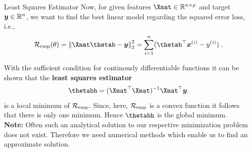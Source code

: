 \documentclass[11pt,compress,t,notes=noshow, xcolor=table]{beamer}
\begin{document}
\begin{vbframe}{Least Squares Estimator}
Now, for given features $\Xmat \in \mathbb{R}^{n\times p}$ and target $\bm{y} \in \mathbb{R}^n$, we want to find the best linear model regarding the squared error loss, i.e.,
\[\risket = \left\Vert \Xmat\thetab - \yv\right\Vert_2^2 = \sumin (\thetab^\top\xv^{(i)} - \yi)\;.\]

With the sufficient condition for continously differentiable functions it can be shown that the \textbf{least squares estimator}
\[\thetabh = (\Xmat^\top\Xmat)^{-1}\Xmat^\top\yv.\]
is a local minimum of $\mathcal{R}_{\text{emp}}$. Since, here, $\mathcal{R}_{\text{emp}}$ is a convex function it follows that there is only one minimum. Hence $\thetabh$ is the global minimum. \\

\lz \textbf{Note:} Often such an analytical solution to our respective minimization problem does not exist. Therefore we need numerical methods which enable us to find an approximate solution.

\end{vbframe}
\end{document}
